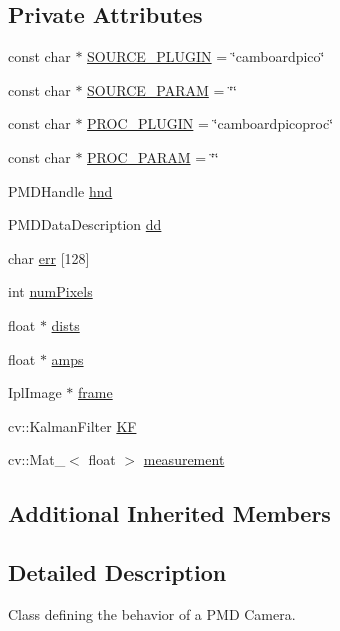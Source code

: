 \subsection*{Private Attributes}
\begin{DoxyCompactItemize}
\item 
const char $\ast$ \hyperlink{class_p_m_d_camera_ae5c857a614ea51781c690fd862f0e7a2}{S\+O\+U\+R\+C\+E\+\_\+\+P\+L\+U\+G\+IN} = \char`\"{}camboardpico\char`\"{}
\item 
const char $\ast$ \hyperlink{class_p_m_d_camera_a439b2e8f27acbc26d4de70d9f8a82386}{S\+O\+U\+R\+C\+E\+\_\+\+P\+A\+R\+AM} = \char`\"{}\char`\"{}
\item 
const char $\ast$ \hyperlink{class_p_m_d_camera_a1f03b40bf2336e61879fc909490f2829}{P\+R\+O\+C\+\_\+\+P\+L\+U\+G\+IN} = \char`\"{}camboardpicoproc\char`\"{}
\item 
const char $\ast$ \hyperlink{class_p_m_d_camera_aef47cd1fda507e9921143f6d0302f5e0}{P\+R\+O\+C\+\_\+\+P\+A\+R\+AM} = \char`\"{}\char`\"{}
\item 
P\+M\+D\+Handle \hyperlink{class_p_m_d_camera_a4422b04aee07aed56b58847d39b2230f}{hnd}
\item 
P\+M\+D\+Data\+Description \hyperlink{class_p_m_d_camera_add31d3bba3f20568e45e3dd864a5bda9}{dd}
\item 
char \hyperlink{class_p_m_d_camera_a096946b5bca77dd8fe416c31f850ae75}{err} \mbox{[}128\mbox{]}
\item 
int \hyperlink{class_p_m_d_camera_a0c9627cf393f3055f81c7259c62010f6}{num\+Pixels}
\item 
float $\ast$ \hyperlink{class_p_m_d_camera_a6aa74776638ecb0b1869a1e12734870a}{dists}
\item 
float $\ast$ \hyperlink{class_p_m_d_camera_a315c2931504d25d5b5d882c4b2d9ad26}{amps}
\item 
Ipl\+Image $\ast$ \hyperlink{class_p_m_d_camera_ad47d6be8f7f11d2772690d3ea36dd432}{frame}
\item 
cv\+::\+Kalman\+Filter \hyperlink{class_p_m_d_camera_ad0d43501bb89e4f24f37e0ba5fa78ae6}{KF}
\item 
cv\+::\+Mat\+\_\+$<$ float $>$ \hyperlink{class_p_m_d_camera_ab7536178e056881c11756892c5f0a4b0}{measurement}
\end{DoxyCompactItemize}
\subsection*{Additional Inherited Members}


\subsection{Detailed Description}
Class defining the behavior of a P\+MD Camera. 

